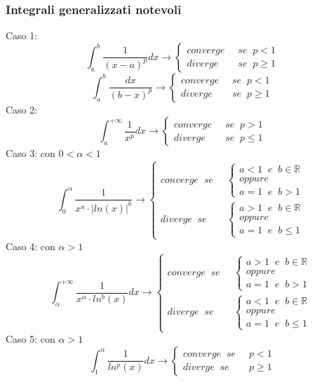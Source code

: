 \subsubsection{Integrali generalizzati notevoli}
Caso 1:
\[
    \int_{a}^{b}\frac{1}{(x-a)^p}dx \rightarrow \begin{cases}
        converge \;\;&se \;\;p<1\\
        diverge \;\;&se \;\; p\geq 1
    \end{cases}
\]
\[
    \int_{a}^{b}\frac{dx}{(b-x)^p} \rightarrow  \begin{cases}
        converge \;\;&se \;\;p<1\\
        diverge \;\;&se \;\; p\geq 1
    \end{cases}
\]
Caso 2:
\[
    \int_{a}^{+\infty}\frac{1}{x^p}dx \rightarrow \begin{cases}
        converge \;\; & se \;\; p > 1\\
        diverge \;\; &  se \;\; p \leq 1
    \end{cases}
\]
Caso 3: con $0< \alpha < 1$
\[
    \int_{0}^{\alpha} \frac{1}{x^a \cdot  |ln(x)|^b} \rightarrow \begin{cases}
        converge \;\; se \;\; & \begin{cases}
            a < 1 \;\; e \;\; b \in \mathbb{R}\\
            oppure \\
            a=1 \;\; e \;\; b > 1
        \end{cases}\\
        diverge \;\; se \;\; & \begin{cases}
            a>1 \;\; e \;\; b \in \mathbb{R}\\
            oppure\\
            a=1 \;\; e \;\; b \leq 1
        \end{cases}
    \end{cases}
\]
Caso 4: con $\alpha > 1$
\[
    \int_{\alpha}^{+\infty} \frac{1}{x^\alpha \cdot ln^b(x)}dx \rightarrow \begin{cases}
        converge \;\; se \;\; & \begin{cases}
            a > 1 \;\; e \;\; b \in \mathbb{R}\\
            oppure \\
            a=1 \;\; e \;\; b > 1
        \end{cases}\\
        diverge \;\; se \;\; & \begin{cases}
            a<1 \;\; e \;\; b \in \mathbb{R}\\
            oppure\\
            a=1 \;\; e \;\; b \leq 1
        \end{cases}
    \end{cases}
\]
Caso 5: con $\alpha> 1$
\[
    \int_{1}^{\alpha}\frac{1}{ln^p(x)} dx \rightarrow \begin{cases}
        converge \;\; se \;\; &p<1\\
        diverge \;\; se \;\; &p\geq 1
    \end{cases}
\]
